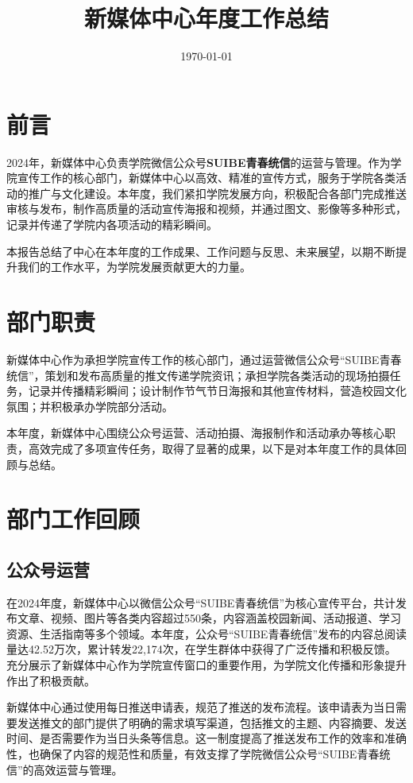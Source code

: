 \documentclass{article}
\title{新媒体中心年度工作总结}
\author{}
\date{\today}
\begin{document}
\maketitle



\newpage
\tableofcontents
\newpage

\section{前言}
2024年，新媒体中心负责学院微信公众号\textbf{SUIBE青春统信}的运营与管理。作为学院宣传工作的核心部门，新媒体中心以高效、精准的宣传方式，服务于学院各类活动的推广与文化建设。本年度，我们紧扣学院发展方向，积极配合各部门完成推送审核与发布，制作高质量的活动宣传海报和视频，并通过图文、影像等多种形式，记录并传递了学院内各项活动的精彩瞬间。

本报告总结了中心在本年度的工作成果、工作问题与反思、未来展望，以期不断提升我们的工作水平，为学院发展贡献更大的力量。
\section{部门职责}
新媒体中心作为承担学院宣传工作的核心部门，通过运营微信公众号“SUIBE青春统信”，策划和发布高质量的推文传递学院资讯；承担学院各类活动的现场拍摄任务，记录并传播精彩瞬间；设计制作节气节日海报和其他宣传材料，营造校园文化氛围；并积极承办学院部分活动。

本年度，新媒体中心围绕公众号运营、活动拍摄、海报制作和活动承办等核心职责，高效完成了多项宣传任务，取得了显著的成果，以下是对本年度工作的具体回顾与总结。

\section{部门工作回顾}
\subsection{公众号运营}
在2024年度，新媒体中心以微信公众号“SUIBE青春统信”为核心宣传平台，共计发布文章、视频、图片等各类内容超过550条，内容涵盖校园新闻、活动报道、学习资源、生活指南等多个领域。本年度，公众号“SUIBE青春统信”发布的内容总阅读量达42.52万次，累计转发22,174次，在学生群体中获得了广泛传播和积极反馈。充分展示了新媒体中心作为学院宣传窗口的重要作用，为学院文化传播和形象提升作出了积极贡献。

新媒体中心通过使用每日推送申请表，规范了推送的发布流程。该申请表为当日需要发送推文的部门提供了明确的需求填写渠道，包括推文的主题、内容摘要、发送时间、是否需要作为当日头条等信息。这一制度提高了推送发布工作的效率和准确性，也确保了内容的规范性和质量，有效支撑了学院微信公众号“SUIBE青春统信”的高效运营与管理。
\end{document}
